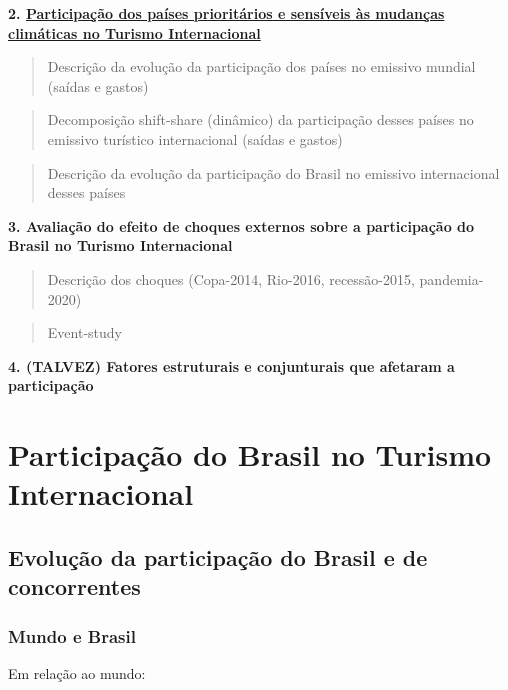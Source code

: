 \documentclass[
  portuguese,
  letterpaper,
  DIV=11,
  numbers=noendperiod]{scrartcl}
\begin{document}
\textbf{2.
\hyperref[participauxe7uxe3o-dos-pauxedses-priorituxe1rios-e-sensuxedveis-uxe0s-mudanuxe7as-climuxe1ticas-no-turismo-internacional]{Participação
dos países prioritários e sensíveis às mudanças climáticas no Turismo
Internacional}}

\begin{quote}
Descrição da evolução da participação dos países no emissivo mundial
(saídas e gastos)
\end{quote}

\begin{quote}
Decomposição shift-share (dinâmico) da participação desses países no
emissivo turístico internacional (saídas e gastos)
\end{quote}

\begin{quote}
Descrição da evolução da participação do Brasil no emissivo
internacional desses países
\end{quote}

\textbf{3. Avaliação do efeito de choques externos sobre a participação
do Brasil no Turismo Internacional}

\begin{quote}
Descrição dos choques (Copa-2014, Rio-2016, recessão-2015,
pandemia-2020)
\end{quote}

\begin{quote}
Event-study
\end{quote}

\textbf{4. (TALVEZ) Fatores estruturais e conjunturais que afetaram a
participação}

\section{Participação do Brasil no Turismo
Internacional}\label{participauxe7uxe3o-do-brasil-no-turismo-internacional}

\subsection{Evolução da participação do Brasil e de
concorrentes}\label{evoluuxe7uxe3o-da-participauxe7uxe3o-do-brasil-e-de-concorrentes}

\subsubsection{Mundo e Brasil}\label{mundo-e-brasil}

Em relação ao mundo:
\end{document}
